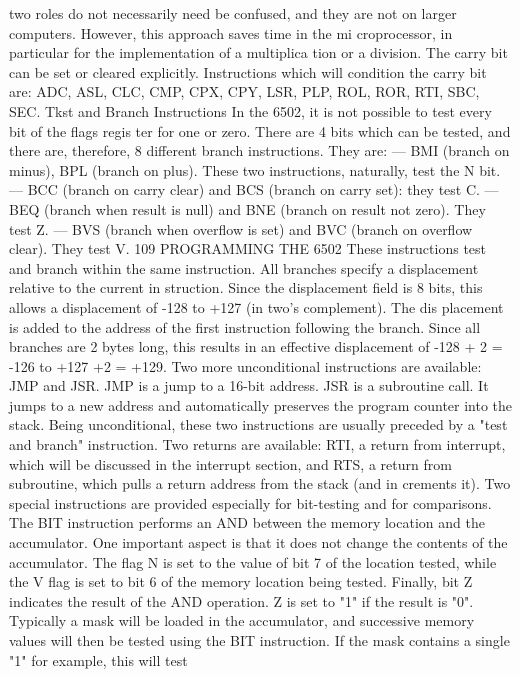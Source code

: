 \documentclass{book}
\begin{document}
two roles do not necessarily need be confused, and they are not on
larger computers. However, this approach saves time in the mi
croprocessor, in particular for the implementation of a multiplica
tion or a division. The carry bit can be set or cleared explicitly.
Instructions which will condition the carry bit are: ADC, ASL,
CLC, CMP, CPX, CPY, LSR, PLP, ROL, ROR, RTI, SBC, SEC.
Tkst and Branch Instructions
In the 6502, it is not possible to test every bit of the flags regis
ter for one or zero. There are 4 bits which can be tested, and there are,
therefore, 8 different branch instructions. They are:
— BMI (branch on minus), BPL (branch on plus). These two
instructions, naturally, test the N bit.
— BCC (branch on carry clear) and BCS (branch on carry set):
they test C.
— BEQ (branch when result is null) and BNE (branch on
result not zero). They test Z.
— BVS (branch when overflow is set) and BVC (branch on
overflow clear). They test V.
109
PROGRAMMING THE 6502
These instructions test and branch within the same instruction.
All branches specify a displacement relative to the current in
struction. Since the displacement field is 8 bits, this allows a
displacement of -128 to +127 (in two's complement). The dis
placement is added to the address of the first instruction following
the branch.
Since all branches are 2 bytes long, this results in an effective
displacement of -128 + 2 = -126 to +127 +2 = +129.
Two more unconditional instructions are available: JMP and
JSR. JMP is a jump to a 16-bit address. JSR is a subroutine call. It
jumps to a new address and automatically preserves the program
counter into the stack. Being unconditional, these two instructions
are usually preceded by a "test and branch" instruction.
Two returns are available: RTI, a return from interrupt, which
will be discussed in the interrupt section, and RTS, a return from
subroutine, which pulls a return address from the stack (and in
crements it).
Two special instructions are provided especially for bit-testing
and for comparisons.
The BIT instruction performs an AND between the memory
location and the accumulator. One important aspect is that it does
not change the contents of the accumulator. The flag N is set to the
value of bit 7 of the location tested, while the V flag is set to
bit 6 of the memory location being tested. Finally, bit Z indicates
the result of the AND operation. Z is set to "1" if the result is "0".
Typically a mask will be loaded in the accumulator, and successive
memory values will then be tested using the BIT instruction.
If the mask contains a single "1" for example, this will test
\end{document}
